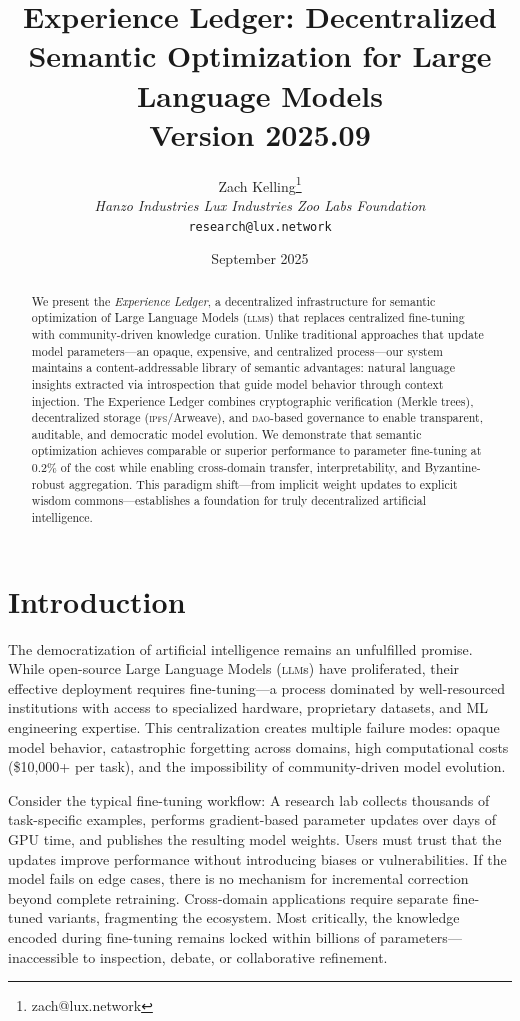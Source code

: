 \documentclass[11pt,letterpaper]{article}
\title{\textbf{Experience Ledger: Decentralized Semantic Optimization for Large Language Models}\\
\large Version 2025.09}
\author{
Zach Kelling\thanks{zach@lux.network}\\
\textit{Hanzo Industries \quad Lux Industries \quad Zoo Labs Foundation}\\
\texttt{research@lux.network}
}
\date{September 2025}
\newcommand{\DAO}{\textsc{dao}}
\newcommand{\IPFS}{\textsc{ipfs}}
\newcommand{\LLM}{\textsc{llm}}
\begin{document}
\zoocoverpage

\begin{abstract}
We present the \textit{Experience Ledger}, a decentralized infrastructure for semantic optimization of Large Language Models (\LLM{}s) that replaces centralized fine-tuning with community-driven knowledge curation. Unlike traditional approaches that update model parameters—an opaque, expensive, and centralized process—our system maintains a content-addressable library of semantic advantages: natural language insights extracted via introspection that guide model behavior through context injection. The Experience Ledger combines cryptographic verification (Merkle trees), decentralized storage (\IPFS{}/Arweave), and \DAO{}-based governance to enable transparent, auditable, and democratic model evolution. We demonstrate that semantic optimization achieves comparable or superior performance to parameter fine-tuning at 0.2\% of the cost while enabling cross-domain transfer, interpretability, and Byzantine-robust aggregation. This paradigm shift—from implicit weight updates to explicit wisdom commons—establishes a foundation for truly decentralized artificial intelligence.
\end{abstract}

\section{Introduction}

The democratization of artificial intelligence remains an unfulfilled promise. While open-source Large Language Models (\LLM{}s) have proliferated, their effective deployment requires fine-tuning—a process dominated by well-resourced institutions with access to specialized hardware, proprietary datasets, and ML engineering expertise. This centralization creates multiple failure modes: opaque model behavior, catastrophic forgetting across domains, high computational costs (\$10,000+ per task), and the impossibility of community-driven model evolution.

Consider the typical fine-tuning workflow: A research lab collects thousands of task-specific examples, performs gradient-based parameter updates over days of GPU time, and publishes the resulting model weights. Users must trust that the updates improve performance without introducing biases or vulnerabilities. If the model fails on edge cases, there is no mechanism for incremental correction beyond complete retraining. Cross-domain applications require separate fine-tuned variants, fragmenting the ecosystem. Most critically, the knowledge encoded during fine-tuning remains locked within billions of parameters—inaccessible to inspection, debate, or collaborative refinement.
\end{document}
